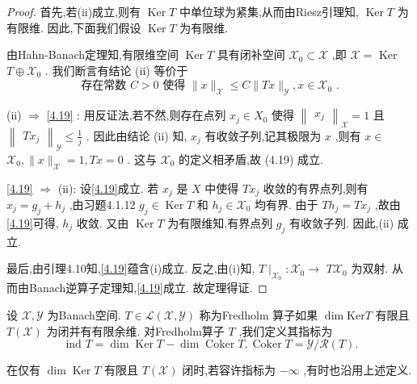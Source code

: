 \documentclass[lang=cn,newtx,10pt,scheme=chinese,thmcnt=chapter]{elegantbook}
\newcommand{\Ker}{\operatorname{Ker}}
\newcommand{\Coker}{\operatorname{Coker}}
\begin{document}
\begin{proof}
    首先,若(ii)成立,则有 \(\operatorname{Ker}T\) 中单位球为紧集,从而由Riesz引理知, \(\operatorname{Ker}T\) 为有限维. 因此,下面我们假设 \(\operatorname{Ker}T\) 为有限维.

由Hahn-Banach定理知,有限维空间 \(\operatorname{Ker}T\) 具有闭补空间 \({\mathcal{X}}_{0} \subset  \mathcal{X}\) ,即 \(\mathcal{X} =\) Ker \(T \oplus  {\mathcal{X}}_{0}\) . 我们断言有结论 (ii) 等价于
\begin{equation}
\text{ 存在常数 }C > 0\text{ 使得 }\parallel x{\parallel }_{\mathcal{X}} \leqslant  C\parallel {Tx}{\parallel }_{\mathcal{Y}},x \in  {\mathcal{X}}_{0}\text{ . } \label{4.19}
\end{equation}

(ii) \(\Rightarrow\) \ref{4.19} : 用反证法,若不然,则存在点列 \({x}_{j} \in  {X}_{0}\) 使得 \({\begin{Vmatrix}{x}_{j}\end{Vmatrix}}_{\mathcal{X}} = 1\) 且 \({\begin{Vmatrix}T{x}_{j}\end{Vmatrix}}_{\mathcal{Y}} \leqslant  \frac{1}{j}\) . 因此由结论 (ii) 知, \({x}_{j}\) 有收敛子列,记其极限为 \(x\) ,则有 \(x \in\)  \({\mathcal{X}}_{0},\parallel x{\parallel }_{\mathcal{X}} = 1,{Tx} = 0\) . 这与 \({\mathcal{X}}_{0}\) 的定义相矛盾,故 (4.19) 成立.

\ref{4.19} \( \Rightarrow  \) (ii): 设\ref{4.19}成立. 若 \({x}_{j}\) 是 \(X\) 中使得 \(T{x}_{j}\) 收敛的有界点列,则有 \({x}_{j} = {g}_{j} + {h}_{j}\) ,由习题4.1.12 \({g}_{j} \in  \operatorname{Ker}T\) 和 \({h}_{j} \in  {\mathcal{X}}_{0}\) 均有界. 由于 \(T{h}_{j} = T{x}_{j}\) ,故由\ref{4.19}可得, \({h}_{j}\) 收敛. 又由 \(\Ker T\) 为有限维知,有界点列 \({g}_{j}\) 有收敛子列. 因此,(ii) 成立.

最后,由引理4.10知,\ref{4.19}蕴含(i)成立. 反之,由(i)知, \(T{ \mid  }_{{\mathcal{X}}_{0}} : {\mathcal{X}}_{0} \rightarrow\)  \(T{\mathcal{X}}_{0}\) 为双射. 从而由Banach逆算子定理知,\ref{4.19}成立. 故定理得证.
\end{proof}
\begin{definition}
    设 \(\mathcal{X},\mathcal{Y}\) 为Banach空间. \(T \in  \mathcal{L}\left( {\mathcal{X},\mathcal{Y}}\right)\) 称为Fredholm 算子如果 \(\dim\mathrm{{Ker}}T\) 有限且 \(T\left( \mathcal{X}\right)\) 为闭并有有限余维. 对Fredholm算子 \(T\) ,我们定义其指标为
\begin{equation*}
\text{ ind }T = \dim \operatorname{Ker}T - \dim \operatorname{Coker}T,\Coker T= \mathcal{Y}/\mathcal{R}(T).
\end{equation*}

\end{definition}
\begin{note}
    在仅有 \(\dim\operatorname{Ker}T\) 有限且 \(T\left( \mathcal{X}\right)\) 闭时,若容许指标为 \(- \infty\) ,有时也沿用上述定义.
\end{note}
\end{document}
